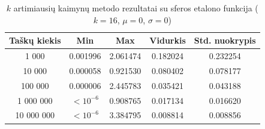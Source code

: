 \begin{table}[H]
    \centering
    \begin{tabular}{|c|c|c|c|c|}
        \hline
        \textbf{Taškų kiekis} & \textbf{Min} & \textbf{Max} & \textbf{Vidurkis} & \textbf{Std. nuokrypis} \\ \hline
        1 000        & 0.001996 & 2.061474 & 0.182024 & 0.232254 \\ \hline
        10 000       & 0.000058 & 0.921530 & 0.080402 & 0.078177 \\ \hline
        100 000      & 0.000006 & 2.445783 & 0.035421 & 0.043188 \\ \hline
        1 000 000    & $<10^{-6}$ & 0.908765 & 0.017134 & 0.016620 \\ \hline
        10 000 000   & $<10^{-6}$ & 3.384795 & 0.008814 & 0.008856 \\ \hline
    \end{tabular}
    \caption{$k$ artimiausių kaimynų metodo rezultatai su sferos etalono funkcija ($k = 16$, $\mu = 0$, $\sigma = 0$)}
\end{table}